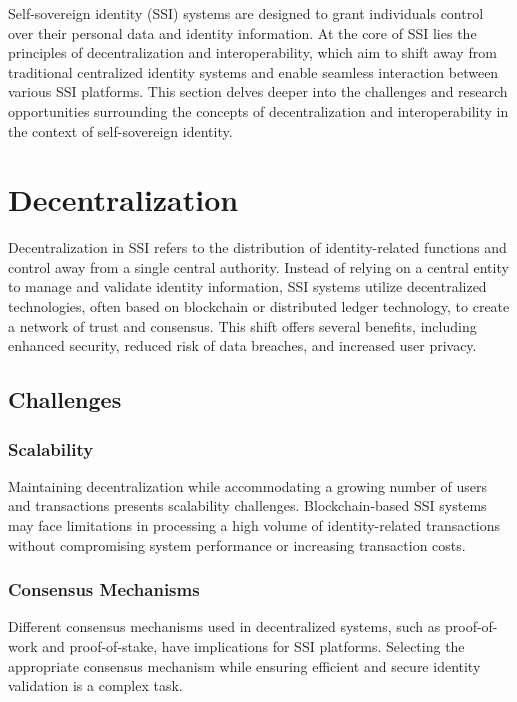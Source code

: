 Self-sovereign identity (SSI) systems are designed to grant individuals control over their personal data and identity information. At the core of SSI lies the principles of decentralization and interoperability, which aim to shift away from traditional centralized identity systems and enable seamless interaction between various SSI platforms. This section delves deeper into the challenges and research opportunities surrounding the concepts of decentralization and interoperability in the context of self-sovereign identity.

\section*{Decentralization}
Decentralization in SSI refers to the distribution of identity-related functions and control away from a single central authority. Instead of relying on a central entity to manage and validate identity information, SSI systems utilize decentralized technologies, often based on blockchain or distributed ledger technology, to create a network of trust and consensus. This shift offers several benefits, including enhanced security, reduced risk of data breaches, and increased user privacy.

\subsection*{Challenges}

\subsubsection*{Scalability} Maintaining decentralization while accommodating a growing number of users and transactions presents scalability challenges. Blockchain-based SSI systems may face limitations in processing a high volume of identity-related transactions without compromising system performance or increasing transaction costs.
\subsubsection*{Consensus Mechanisms} Different consensus mechanisms used in decentralized systems, such as proof-of-work and proof-of-stake, have implications for SSI platforms. Selecting the appropriate consensus mechanism while ensuring efficient and secure identity validation is a complex task.
